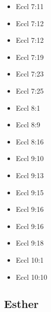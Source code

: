 \documentclass[14pt]{book}
\begin{document}
\begin{multicols}{2}
\begin{itemize}
					\item Eccl 7:11
					
					\item Eccl 7:12
					
					\item Eccl 7:12
					
					\item Eccl 7:19
					
					\item Eccl 7:23
					
					\item Eccl 7:25
					
					\item Eccl 8:1
					
					\item Eccl 8:9
					
					\item Eccl 8:16
					
					\item Eccl 9:10
					
					\item Eccl 9:13
					
					\item Eccl 9:15
					
					\item Eccl 9:16
					
					\item Eccl 9:16
					
					\item Eccl 9:18
					
					\item Eccl 10:1
					
					\item Eccl 10:10
					
\end{itemize}\end{multicols}

\subsection{Esther}
\end{document}
